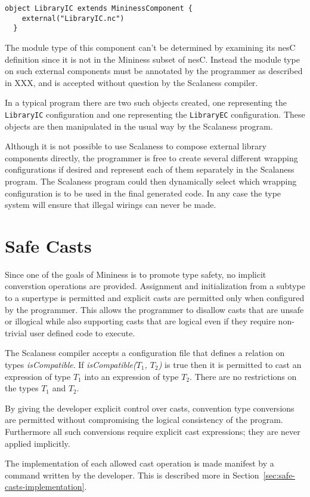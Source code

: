 \singlespace
\vspace{1.0ex}
\begin{lstlisting}[language=scalaness]
  object LibraryIC extends MininessComponent {
    external("LibraryIC.nc")
  }
\end{lstlisting}
\vspace{1.0ex}
\primaryspacing

The module type of this component can't be determined by examining its nesC definition since it
is not in the Mininess subset of nesC. Instead the module type on such external components must
be annotated by the programmer as described in XXX, and is accepted without question by the
Scalaness compiler.

In a typical program there are two such objects created, one representing the \texttt{LibraryIC}
configuration and one representing the \texttt{LibraryEC} configuration. These objects are then
manipulated in the usual way by the Scalaness program.

Although it is not possible to use Scalaness to compose external library components directly,
the programmer is free to create several different wrapping configurations if desired and
represent each of them separately in the Scalaness program. The Scalaness program could then
dynamically select which wrapping configuration is to be used in the final generated code. In
any case the type system will ensure that illegal wirings can never be made.

\section{Safe Casts}
\label{sec:safe-casts-design}

Since one of the goals of Mininess is to promote type safety, no implicit converstion operations
are provided. Assignment and initialization from a subtype to a supertype is permitted and
explicit casts are permitted only when configured by the programmer. This allows the programmer
to disallow casts that are unsafe or illogical while also supporting casts that are logical even
if they require non-trivial user defined code to execute.

The Scalaness compiler accepts a configuration file that defines a relation on types
\textit{isCompatible}. If \textit{isCompatible($T_1$, $T_2$)} is true then it is permitted to
cast an expression of type $T_1$ into an expression of type $T_2$. There are no restrictions on
the types $T_1$ and $T_2$.

By giving the developer explicit control over casts, convention type conversions are permitted
without compromising the logical consistency of the program. Furthermore all such conversions
require explicit cast expressions; they are never applied implicitly.

The implementation of each allowed cast operation is made manifest by a command written by the
developer. This is described more in Section~\ref{sec:safe-casts-implementation}.


